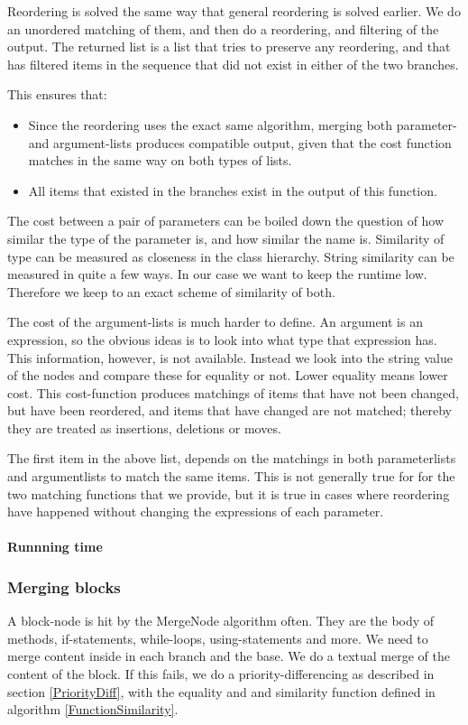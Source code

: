 \documentclass[11pt]{article}
\begin{document}
Reordering is solved the same way that general reordering is solved earlier. We do an unordered matching of them, and then do a reordering, and filtering of the output. The returned list is a list that tries to preserve any reordering, and that has filtered items in the sequence that did not exist in either of the two branches.

This ensures that:

\begin{itemize}
   \item Since the reordering uses the exact same algorithm, merging both parameter- and argument-lists produces compatible output, given that the cost function matches in the same way on both types of lists.
   \item All items that existed in the branches exist in the output of this function. 
\end{itemize}

The cost between a pair of parameters can be boiled down the question of how similar the type of the parameter is, and how similar the name is. Similarity of type can be measured as closeness in the class hierarchy. String similarity can be measured in quite a few ways. In our case we want to keep the runtime low. Therefore we keep to an exact scheme of similarity of both.

The cost of the argument-lists is much harder to define. An argument is an expression, so the obvious ideas is to look into what type that expression has. This information, however, is not available. Instead we look into the string value of the nodes and compare these for equality or not. Lower equality means lower cost. This cost-function produces matchings of items that have not been changed, but have been reordered, and items that have changed are not matched; thereby they are treated as insertions, deletions or moves.

The first item in the above list, depends on the matchings in both parameterlists and argumentlists to match the same items. This is not generally true for for the two matching functions that we provide, but it is true in cases where reordering have happened without changing the expressions of each parameter.

\paragraph{Runnning time} 

\subsubsection{Merging blocks}
A block-node is hit by the MergeNode algorithm often. They are the body of methods, if-statements, while-loops, using-statements and more. We need to merge content inside in each branch and the base. We do a textual merge of the content of the block. If this fails, we do a priority-differencing as described in section \ref{PriorityDiff}, with the equality and and similarity function defined in algorithm \ref{FunctionSimilarity}.
\end{document}
